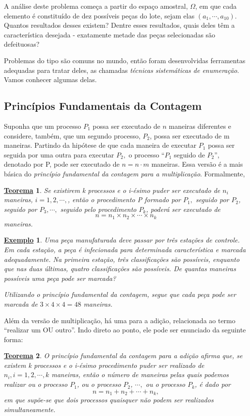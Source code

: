 \documentclass{article}
\newtheorem*{theorem*}{\underline{Teorema}}
\newtheorem{example}{\underline{Exemplo}}
\begin{document}
  A análise deste problema começa a partir do espaço amostral, \(\Omega \), em que cada elemento
é constituído de dez possíveis peças do lote, sejam elas \((a_{1}, \cdots, a_{10})\). Quantos resultados
desses existem? Dentre esses resultados, quais deles têm a característica desejada - exatamente metade das
peças selecionadas são defeituosas?

  Problemas do tipo são comuns no mundo, então foram desenvolvidas ferramentas adequadas para tratar deles, as chamadas
\textit{técnicas sistemáticas de enumeração}. Vamos conhecer algumas delas.
\subsection{Princípios Fundamentais da Contagem}
  Suponha que um processo \(P_{1}\) possa ser executado de \(n\) maneiras diferentes e considere,
também, que um segundo processo, \(P_{2}\), possa ser executado de m maneiras. Partindo da hipótese de que
cada maneira de executar \(P_{1}\) possa ser seguida por uma outra para executar \(P_{2},\) o processo
``\(P_{1}\) seguido de \(P_{2}\)'', denotado por P, pode ser executado de \(n=n \cdot m\) maneiras. Essa versão é 
a mais básica do \textit{princípio fundamental da contagem para a multiplicação}. Formalmente,
\begin{theorem*}
  Se existirem k processos e o i-ésimo puder ser executado de \(n_{i}\) maneiras, \(i=1, 2, \cdots, \), então
o procedimento P formado por \(P_{1},\) seguido por \(P_{2}\), seguido por \(P_{3}, \cdots,\) seguido pelo procedimento \(P_{k}\),
poderá ser executado de 
  \[
    n = n_{1}\times n_{2}\times \cdots\times n_{k}
  \]
  maneiras.
\end{theorem*}
\begin{example}
  Uma peça manufaturada deve passar por três estações de controle. Em cada estação, a peça é
infecionada para determinada característica e marcada adequadamente. Na primeira estação, três
classificações são possíveis, enquanto que nas duas últimas, quatro classificações são possíveis. 
De quantas maneiras possíveis uma peça pode ser marcada?

  Utilizando o princípio fundamental da contagem, segue que cada peça pode ser marcada de \(3\times 4\times 4 = 48\) maneiras.
\end{example}
  Além da versão de multiplicação, há uma para a adição, relacionada ao termo ``realizar um OU outro''.
Indo direto ao ponto, ele pode ser enunciado da seguinte forma:
\begin{theorem*}
  O \textit{princípio fundamental da contagem para a adição} afirma que, se existem k processos
e o i-ésimo procedimento puder ser realizado de \(n_{i}, i = 1, 2, \cdots, k\) maneiras, então
o número de maneiras pelas quais podemos realizar ou o processo \(P_1\), ou o processo \(P_{2}\),
 \(\cdots,\) ou o processo \(P_{k}\), é dado por 
   \[
     n = n_1 + n_{2} + \cdots + n_{k},
   \]
  em que supõe-se que dois processos quaisquer não podem ser realizados simultaneamente.
\end{theorem*}
\end{document}
